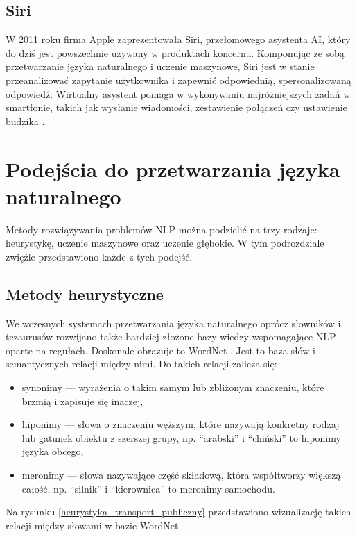         \subsection{Siri}
        W 2011 roku firma Apple zaprezentowała Siri, przełomowego asystenta AI, który do dziś jest powszechnie używany w produktach koncernu. Komponując ze sobą przetwarzanie języka naturalnego i uczenie maszynowe, Siri jest w stanie przeanalizować zapytanie użytkownika i zapewnić odpowiednią, spersonalizowaną odpowiedź. Wirtualny asystent pomaga w wykonywaniu najróżniejszych zadań w smartfonie, takich jak wysłanie wiadomości, zestawienie połączeń czy ustawienie budzika \cite{from_eliza_to_chatgpt2024}.

        
    \section{Podejścia do przetwarzania języka naturalnego}
    Metody rozwiązywania problemów NLP można podzielić na trzy rodzaje: heurystykę, uczenie maszynowe oraz uczenie głębokie. W tym podrozdziale zwięźle przedstawiono każde z tych podejść.

        \subsection{Metody heurystyczne}
        We wczesnych systemach przetwarzania języka naturalnego oprócz słowników i tezaurusów rozwijano także bardziej złożone bazy wiedzy wspomagające NLP oparte na regułach. Doskonale obrazuje to WordNet \cite{wordnet_d3}. Jest to baza słów i semantycznych relacji między nimi. Do takich relacji zalicza się:

        \begin{itemize}
            \item synonimy — wyrażenia o takim samym lub zbliżonym znaczeniu, które brzmią i zapisuje się inaczej,
            \item hiponimy — słowa o znaczeniu węższym, które nazywają konkretny rodzaj lub gatunek obiektu z szerszej grupy, np. \enquote{arabski} i \enquote{chiński} to hiponimy języka obcego,
            \item meronimy — słowa nazywające część składową, która współtworzy większą całość, np. \enquote{silnik} i \enquote{kierownica} to meronimy samochodu.
        \end{itemize}

        \noindent Na rysunku \ref{heurystyka_transport_publiczny} przedstawiono wizualizację takich relacji między słowami w bazie WordNet.


